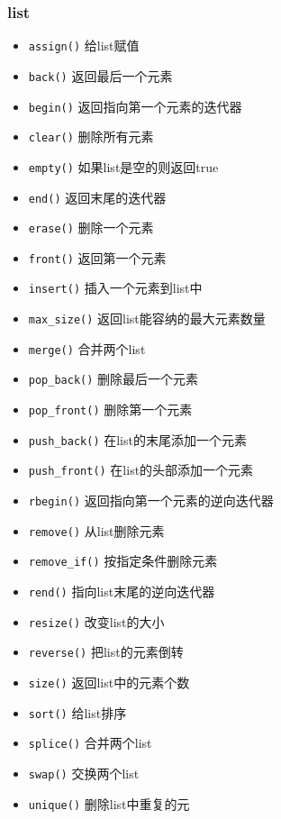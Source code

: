 \subsubsection{list}
	\begin{itemize}
		\item \texttt{assign()} 给list赋值 
		\item \texttt{back()} 返回最后一个元素 
		\item \texttt{begin()} 返回指向第一个元素的迭代器 
		\item \texttt{clear()} 删除所有元素 
		\item \texttt{empty()} 如果list是空的则返回true 
		\item \texttt{end()} 返回末尾的迭代器
		\item \texttt{erase()} 删除一个元素
		\item \texttt{front()} 返回第一个元素
		\item \texttt{insert()} 插入一个元素到list中
		\item \texttt{max_size()} 返回list能容纳的最大元素数量
		\item \texttt{merge()} 合并两个list
		\item \texttt{pop_back()} 删除最后一个元素
		\item \texttt{pop_front()} 删除第一个元素
		\item \texttt{push_back()} 在list的末尾添加一个元素
		\item \texttt{push_front()} 在list的头部添加一个元素
		\item \texttt{rbegin()} 返回指向第一个元素的逆向迭代器
		\item \texttt{remove()} 从list删除元素
		\item \texttt{remove_if()} 按指定条件删除元素
		\item \texttt{rend()} 指向list末尾的逆向迭代器
		\item \texttt{resize()} 改变list的大小
		\item \texttt{reverse()} 把list的元素倒转
		\item \texttt{size()} 返回list中的元素个数
		\item \texttt{sort()} 给list排序
		\item \texttt{splice()} 合并两个list
		\item \texttt{swap()} 交换两个list
		\item \texttt{unique()} 删除list中重复的元
	\end{itemize}
